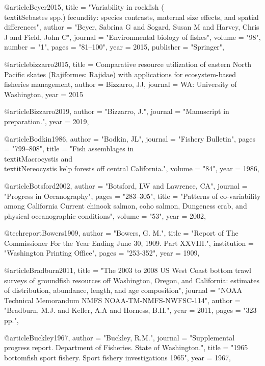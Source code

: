 @article{Beyer2015,
    title = "{Variability in rockfish (\\textit{{Sebastes}} spp.) fecundity: species contrasts, maternal size effects, and spatial differences}",
    author = "{Beyer, Sabrina G and Sogard, Susan M and Harvey, Chris J and Field, John C}",
    journal = "{Environmental biology of fishes}",
    volume = "{98}",
    number = "{1}",
    pages = "{81--100}",
    year = 2015,
    publisher = "{Springer}",
}

@article{bizzarro2015,
  title = {Comparative resource utilization of eastern North Pacific skates (Rajiformes: Rajidae) with applications for ecosystem-based fisheries management},
  author = {Bizzarro, JJ},
  journal = {WA: University of Washington},
  year = 2015
}

@article{Bizzarro2019,
    author = "{Bizzarro, J.}",
    journal = "{Manuscript in preparation.}",
    year = 2019,
}

@article{Bodkin1986,
    author = "{Bodkin, JL}",
    journal = "{Fishery Bulletin}",
    pages = "{799--808}",
    title = "{{Fish assemblages in \\textit{Macrocystis} and \\textit{Nereocystis} kelp forests off central California.}}",
    volume = "{84}",
    year = 1986,
}

@article{Botsford2002,
    author = "{Botsford, LW and Lawrence, CA}",
    journal = "{Progress in Oceanography}",
    pages = "{283--305}",
    title = "{{Patterns of co-variability among California Current chinook salmon, coho salmon, Dungeness crab, and physical oceanographic conditions}}",
    volume = "{53}",
    year = 2002,
}

@techreport{Bowers1909,
    author = "{Bowers, G. M.}",
    title = "{Report of The Commissioner For the Year Ending June 30, 1909. Part XXVIII.}",
    institution = "{Washington Printing Office}",
    pages = "{253-352}",
    year = 1909,
}

@article{Bradburn2011,
    title = "{The 2003 to 2008 {US} {West} {Coast} bottom trawl surveys of groundfish resources off {Washington}, {Oregon}, and {California}: estimates of distribution, abundance, length, and age composition}",
    journal = "{NOAA Technical Memorandum NMFS NOAA-TM-NMFS-NWFSC-114}",
    author = "{Bradburn, M.J. and Keller, A.A and Horness, B.H.}",
    year = 2011,
    pages = "{323 pp.}",
}

@article{Buckley1967,
    author = "{Buckley, R.M.}",
    journal = "{Supplemental progress report. Department of Fisheries. State of Washington.}",
    title = "{{1965 bottomfish sport fishery. Sport fishery investigations 1965}}",
    year = 1967,
}

